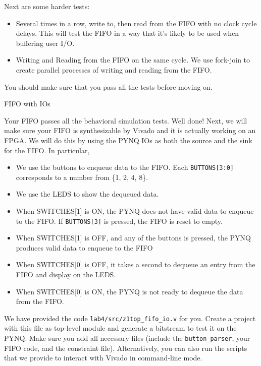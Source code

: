 \documentclass[11pt]{article}
\makeatletter
\renewcommand{\subsection}
{\@startsection {subsection}{1}{0pt}
 {-1ex}
 {0.5ex}
 {\bfseries\normalsize}}
\makeatother
\begin{document}
Next are some harder tests:

\begin{itemize}
    \item Several times in a row, write to, then read from the FIFO with no clock cycle delays.
      This will test the FIFO in a way that it's likely to be used when buffering user I/O.

    \item Writing and Reading from the FIFO on the same cycle. We use fork-join to create parallel processes of writing and reading from the FIFO.
\end{itemize}

You should make sure that you pass all the tests before moving on.

\subsection{FIFO with IOs}

Your FIFO passes all the behavioral simulation tests. Well done! Next, we will make sure your FIFO is synthesizable by Vivado and it is actually working on an FPGA. We will do this by using the PYNQ IOs as both the source and the sink for the FIFO. In particular,

\begin{itemize}
    \item We use the buttons to enqueue data to the FIFO. Each \verb|BUTTONS[3:0]| corresponds to a number from \{1, 2, 4, 8\}.
    \item We use the LEDS to show the dequeued data.
    \item When SWITCHES[1] is ON, the PYNQ does not have valid data to enqueue to the FIFO. If \verb|BUTTONS[3]| is pressed, the FIFO is reset to empty.
    \item When SWITCHES[1] is OFF, and any of the buttons is pressed, the PYNQ produces valid data to enqueue to the FIFO
    \item When SWITCHES[0] is OFF, it takes a second to dequeue an entry from the FIFO and display on the LEDS.
    \item When SWITCHES[0] is ON, the PYNQ is not ready to dequeue the data from the FIFO.
\end{itemize}

We have provided the code \verb|lab4/src/z1top_fifo_io.v| for you. Create a project with this file as top-level module and generate a bitstream to test it on the PYNQ. Make sure you add all necessary files (include the \verb|button_parser|, your FIFO code, and the constraint file). Alternatively, you can also run the scripts that we provide to interact with Vivado in command-line mode.
\end{document}
